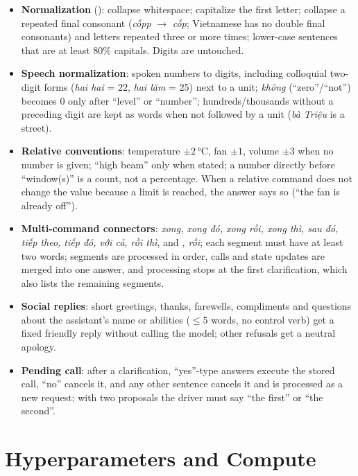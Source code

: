 \begin{itemize}
  \item \textbf{Normalization} (): collapse whitespace; capitalize the first letter; collapse a
  repeated final consonant (\textit{cốpp} $\rightarrow$ \textit{cốp}; Vietnamese has no double final consonants) and letters
  repeated three or more times; lower-case sentences that are at least 80\% capitals. Digits are untouched.
  \item \textbf{Speech normalization}: spoken numbers to digits, including colloquial two-digit forms (\textit{hai hai} = 22,
  \textit{hai lăm} = 25) next to a unit; \textit{không} (``zero''/``not'') becomes 0 only after ``level'' or ``number'';
  hundreds/thousands without a preceding digit are kept as words when not followed by a unit (\textit{bà Triệu} is a street).
  \item \textbf{Relative conventions}: temperature $\pm2$\,°C, fan $\pm1$, volume $\pm3$ when no number is given; ``high
  beam'' only when stated; a number directly before ``window(s)'' is a count, not a percentage. When a relative command does not
  change the value because a limit is reached, the answer says so (``the fan is already off'').
  \item \textbf{Multi-command connectors}: \textit{xong, xong đó, xong rồi, xong thì, sau đó, tiếp theo, tiếp đó, với cả,
  rồi thì}, and \textit{, rồi}; each segment must have at least two words; segments are processed in order, calls and state
  updates are merged into one answer, and processing stops at the first clarification, which also lists the remaining segments.
  \item \textbf{Social replies}: short greetings, thanks, farewells, compliments and questions about the assistant's name or
  abilities ($\le$5 words, no control verb) get a fixed friendly reply without calling the model; other refusals get a neutral
  apology.
  \item \textbf{Pending call}: after a clarification, ``yes''-type answers execute the stored call, ``no'' cancels it, and any
  other sentence cancels it and is processed as a new request; with two proposals the driver must say ``the first'' or ``the
  second''.
\end{itemize}

\section{Hyperparameters and Compute}
\label{app:compute}

